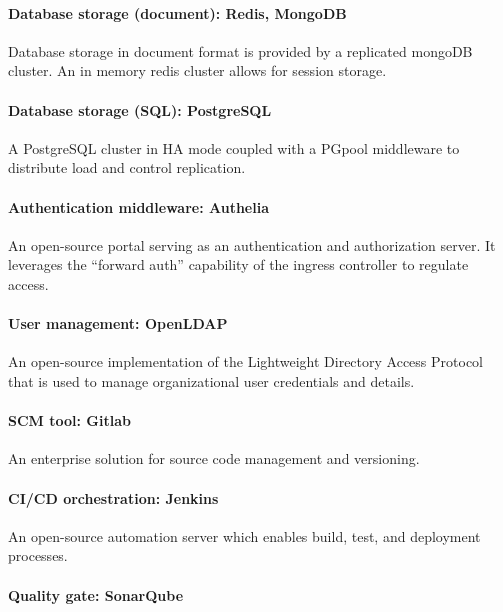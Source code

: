 \paragraph{Database storage (document): Redis, MongoDB }

Database storage in document format is provided by a replicated mongoDB cluster. An in memory redis cluster allows for session storage. 

\paragraph{Database storage (SQL): PostgreSQL }

A PostgreSQL cluster in HA mode coupled with a PGpool middleware to distribute load and control replication. 

\paragraph{Authentication middleware: Authelia }

An open-source portal serving as an authentication and authorization server. It leverages the “forward auth” capability of the ingress controller to regulate access. 

\paragraph{User management: OpenLDAP }

An open-source implementation of the Lightweight Directory Access Protocol that is used to manage organizational user credentials and details. 

\paragraph{SCM tool: Gitlab }

An enterprise solution for source code management and versioning. 

\paragraph{CI/CD orchestration: Jenkins }

An open-source automation server which enables build, test, and deployment processes. 

\paragraph{Quality gate: SonarQube }

